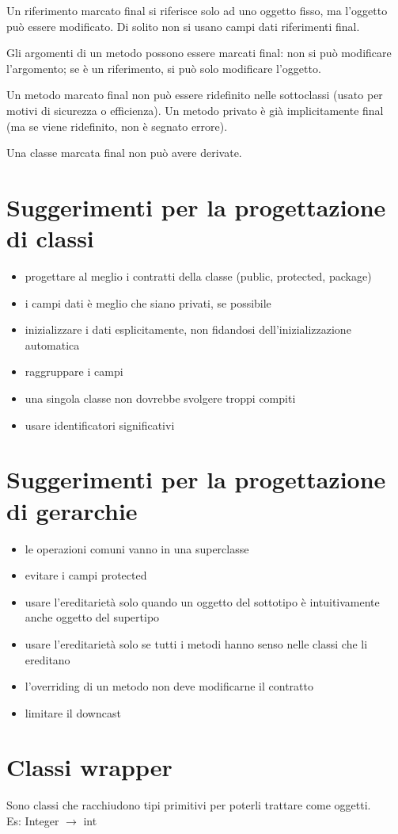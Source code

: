 Un riferimento marcato final si riferisce solo ad uno oggetto fisso, ma l'oggetto può essere modificato. Di solito non si usano campi dati riferimenti final.

Gli argomenti di un metodo possono essere marcati final: non si può modificare l'argomento; se è un riferimento, si può solo modificare l'oggetto.

Un metodo marcato final non può essere ridefinito nelle sottoclassi (usato per motivi di sicurezza o efficienza). Un metodo privato è già implicitamente final (ma se viene ridefinito, non è segnato errore).

Una classe marcata final non può avere derivate.

\section{Suggerimenti per la progettazione di classi} %
\begin{itemize}
\item progettare al meglio i contratti della classe (public, protected, package)
\item i campi dati è meglio che siano privati, se possibile
\item inizializzare i dati esplicitamente, non fidandosi dell'inizializzazione automatica
\item raggruppare i campi
\item una singola classe non dovrebbe svolgere troppi compiti
\item usare identificatori significativi
\end{itemize}

\section{Suggerimenti per la progettazione di gerarchie} %
\begin{itemize}
\item le operazioni comuni vanno in una superclasse
\item evitare i campi protected
\item usare l'ereditarietà solo quando un oggetto del sottotipo è intuitivamente anche oggetto del supertipo
\item usare l'ereditarietà solo se tutti i metodi hanno senso nelle classi che li ereditano
\item l'overriding di un metodo non deve modificarne il contratto
\item limitare il downcast
\end{itemize}

\section{Classi wrapper} %
Sono classi che racchiudono tipi primitivi per poterli trattare come oggetti.\\
Es: Integer $\rightarrow$ int

